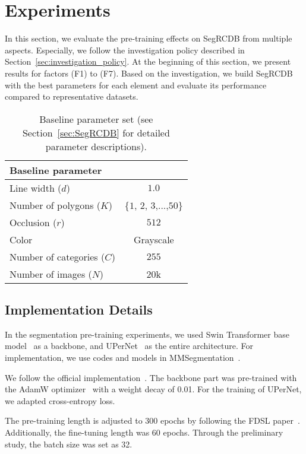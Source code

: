 \documentclass[10pt,twocolumn,letterpaper]{article}
\begin{document}
\section{Experiments}

In this section, we evaluate the pre-training effects on SegRCDB from multiple aspects. Especially, we follow the investigation policy described in Section~\ref{sec:investigation_policy}. At the beginning of this section, we present results for factors (F1) to (F7). 
Based on the investigation, we build SegRCDB with the best parameters for each element and  evaluate its performance compared to representative datasets.

\begin{table}
  \centering
  \caption{Baseline parameter set (see Section~\ref{sec:SegRCDB} for detailed parameter descriptions).}
  \begin{tabular}{lc}
    \toprule
     Baseline parameter&\\
    \midrule
        Line width ($d$) & $1.0$ \\
        Number of polygons ($K$) & \{$1$, $2$, $3$,...,$50$\}\\
        Occlusion ($r$)  & $512$\\
        Color & Grayscale\\
        Number of categories ($C$) & $255$ \\
        Number of images ($N$) & $20$k\\
    \bottomrule
  \end{tabular}
  \label{benchmark}
\end{table}

\subsection{Implementation Details}
\label{sec:investigate_setting}
 In the segmentation pre-training experiments, we used Swin Transformer base model~\cite{liu2021Swin} as a backbone, and UPerNet~\cite{xiao2018unified} as the entire architecture. For implementation, we use codes and models in MMSegmentation~\cite{mmseg2020}. 

We follow the official implementation~\cite{liu2021Swin}.
The backbone part was pre-trained with the AdamW optimizer~\cite{Loshchilov2019DecoupledWD} with a weight decay of 0.01. For the training of UPerNet, we adapted cross-entropy loss. 

The pre-training length is adjusted to 300 epochs by following the FDSL paper~\cite{Kataoka_2022_CVPR}. Additionally, the fine-tuning length was 60 epochs. Through the preliminary study, the batch size was set as 32.
\end{document}
